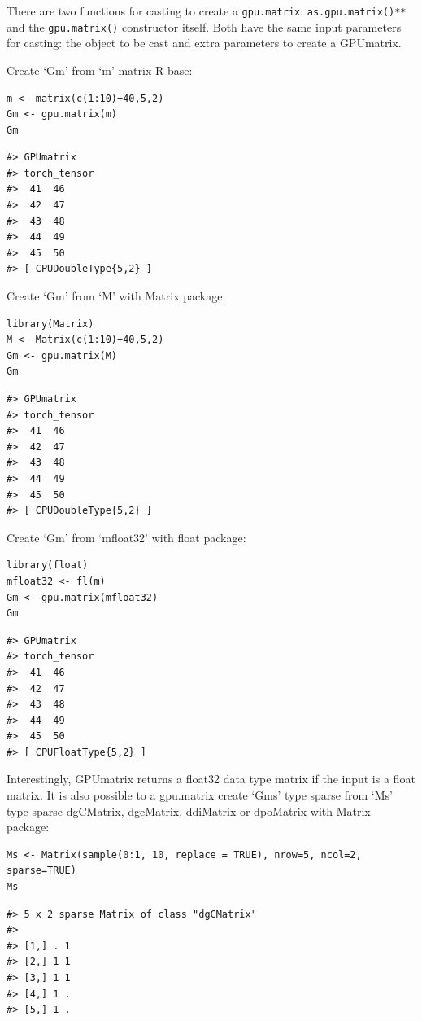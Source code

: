 There are two functions for casting to create a \texttt{gpu.matrix}: \texttt{as.gpu.matrix()**} and the \texttt{gpu.matrix()} constructor itself. Both have the same input parameters for casting: the object to be cast and extra parameters to create a GPUmatrix.

Create `Gm' from `m' matrix R-base:

\begin{verbatim}
m <- matrix(c(1:10)+40,5,2)
Gm <- gpu.matrix(m)
Gm
\end{verbatim}

\begin{verbatim}
#> GPUmatrix
#> torch_tensor
#>  41  46
#>  42  47
#>  43  48
#>  44  49
#>  45  50
#> [ CPUDoubleType{5,2} ]
\end{verbatim}

Create `Gm' from `M' with Matrix package:

\begin{verbatim}
library(Matrix)
M <- Matrix(c(1:10)+40,5,2)
Gm <- gpu.matrix(M)
Gm
\end{verbatim}

\begin{verbatim}
#> GPUmatrix
#> torch_tensor
#>  41  46
#>  42  47
#>  43  48
#>  44  49
#>  45  50
#> [ CPUDoubleType{5,2} ]
\end{verbatim}

Create `Gm' from `mfloat32' with float package:

\begin{verbatim}
library(float)
mfloat32 <- fl(m)
Gm <- gpu.matrix(mfloat32)
Gm
\end{verbatim}

\begin{verbatim}
#> GPUmatrix
#> torch_tensor
#>  41  46
#>  42  47
#>  43  48
#>  44  49
#>  45  50
#> [ CPUFloatType{5,2} ]
\end{verbatim}

Interestingly, GPUmatrix returns a float32 data type matrix if the input is a float matrix. It is also possible to a gpu.matrix create `Gms' type sparse from `Ms' type sparse dgCMatrix, dgeMatrix, ddiMatrix or dpoMatrix with Matrix package:

\begin{verbatim}
Ms <- Matrix(sample(0:1, 10, replace = TRUE), nrow=5, ncol=2, sparse=TRUE)
Ms
\end{verbatim}

\begin{verbatim}
#> 5 x 2 sparse Matrix of class "dgCMatrix"
#>         
#> [1,] . 1
#> [2,] 1 1
#> [3,] 1 1
#> [4,] 1 .
#> [5,] 1 .
\end{verbatim}

